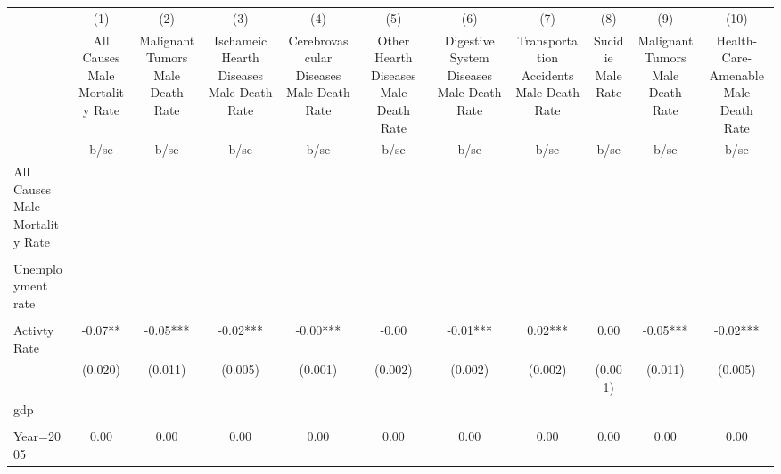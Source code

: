 {
\def\sym#1{\ifmmode^{#1}\else\(^{#1}\)\fi}
\begin{tabular}{l*{10}{c}}
\hline\hline
                    &\multicolumn{1}{c}{(1)}&\multicolumn{1}{c}{(2)}&\multicolumn{1}{c}{(3)}&\multicolumn{1}{c}{(4)}&\multicolumn{1}{c}{(5)}&\multicolumn{1}{c}{(6)}&\multicolumn{1}{c}{(7)}&\multicolumn{1}{c}{(8)}&\multicolumn{1}{c}{(9)}&\multicolumn{1}{c}{(10)}\\
                    &\multicolumn{1}{c}{All Causes Male Mortality Rate}&\multicolumn{1}{c}{Malignant Tumors Male Death Rate}&\multicolumn{1}{c}{Ischameic Hearth Diseases Male Death Rate}&\multicolumn{1}{c}{Cerebrovascular Diseases Male Death Rate}&\multicolumn{1}{c}{Other Hearth Diseases Male Death Rate}&\multicolumn{1}{c}{Digestive System Diseases Male Death Rate}&\multicolumn{1}{c}{Transportation Accidents Male Death Rate}&\multicolumn{1}{c}{Sucidie Male Rate}&\multicolumn{1}{c}{Malignant Tumors Male Death Rate}&\multicolumn{1}{c}{Health-Care-Amenable Male Death Rate}\\
                    &  b/se   &  b/se   &  b/se   &  b/se   &  b/se   &  b/se   &  b/se   &  b/se   &  b/se   &  b/se   \\
\hline
All Causes Male Mortality Rate&         &         &         &         &         &         &         &         &         &         \\
                    &         &         &         &         &         &         &         &         &         &         \\
Unemployment rate   &         &         &         &         &         &         &         &         &         &         \\
                    &         &         &         &         &         &         &         &         &         &         \\
Activty Rate        & -0.07** & -0.05***& -0.02***& -0.00***& -0.00   & -0.01***&  0.02***&  0.00   & -0.05***& -0.02***\\
                    &(0.020)   &(0.011)   &(0.005)   &(0.001)   &(0.002)   &(0.002)   &(0.002)   &(0.001)   &(0.011)   &(0.005)   \\
gdp                 &         &         &         &         &         &         &         &         &         &         \\
                    &         &         &         &         &         &         &         &         &         &         \\
Year=2005           &  0.00   &  0.00   &  0.00   &  0.00   &  0.00   &  0.00   &  0.00   &  0.00   &  0.00   &  0.00   \\

\end{tabular}}
